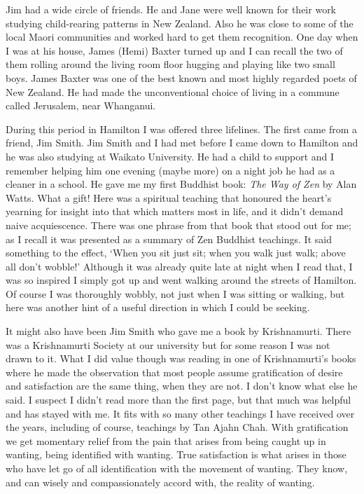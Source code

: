 Jim had a wide circle of friends. He and Jane were well known for their
work studying child-rearing patterns in New Zealand. Also he was close
to some of the local Maori communities and worked hard to get them
recognition. One day when I was at his house, James (Hemi) Baxter turned
up and I can recall the two of them rolling around the living room floor
hugging and playing like two small boys. James Baxter was one of the
best known and most highly regarded poets of New Zealand. He had made
the unconventional choice of living in a commune called Jerusalem, near
Whanganui.

During this period in Hamilton I was offered three lifelines. The first
came from a friend, Jim Smith. Jim Smith and I had met before I came
down to Hamilton and he was also studying at Waikato University. He had
a child to support and I remember helping him one evening (maybe more)
on a night job he had as a cleaner in a school. He gave me my first
Buddhist book: \emph{The Way of Zen} by Alan Watts. What a gift! Here
was a spiritual teaching that honoured the heart's yearning for insight
into that which matters most in life, and it didn't demand naive
acquiescence. There was one phrase from that book that stood out for me;
as I recall it was presented as a summary of Zen Buddhist teachings. It
said something to the effect, `When you sit just sit; when you walk just
walk; above all don't wobble!' Although it was already quite late at
night when I read that, I was so inspired I simply got up and went
walking around the streets of Hamilton. Of course I was thoroughly
wobbly, not just when I was sitting or walking, but here was another
hint of a useful direction in which I could be seeking.

It might also have been Jim Smith who gave me a book by Krishnamurti.
There was a Krishnamurti Society at our university but for some reason I
was not drawn to it. What I did value though was reading in one of
Krishnamurti's books where he made the observation that most people
assume gratification of desire and satisfaction are the same thing, when
they are not. I don't know what else he said. I suspect I didn't read
more than the first page, but that much was helpful and has stayed with
me. It fits with so many other teachings I have received over the years,
including of course, teachings by Tan Ajahn Chah. With gratification we
get momentary relief from the pain that arises from being caught up in
wanting, being identified with wanting. True satisfaction is what arises
in those who have let go of all identification with the movement of
wanting. They know, and can wisely and compassionately accord with, the
reality of wanting.

